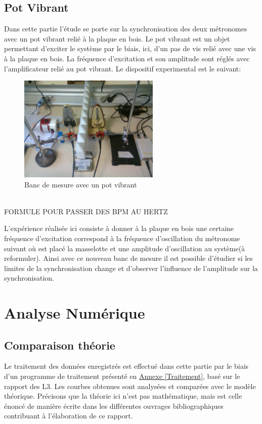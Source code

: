 \documentclass[a4paper,11pt]{report}
\begin{document}
\section{Pot Vibrant}
Dans cette partie l'étude se porte sur la synchronisation des deux métronomes avec un pot vibrant relié à la plaque en bois. Le pot vibrant est un objet permettant d'exciter le système par le biais, ici, d'un pas de vis relié avec une vis à la plaque en bois. La fréquence d'excitation et son amplitude sont réglés avec l'amplificateur relié au pot vibrant. Le dispositif experimental est le suivant:
\begin{figure}[h]
\centering
\includegraphics[width=0.6\textwidth]{Bancpotvibrant}
\caption{Banc de mesure avec un pot vibrant}\label{BancPot}
\end{figure}\\

FORMULE POUR PASSER DES BPM AU HERTZ

L'expérience réalisée ici consiste à donner à la plaque en bois une certaine fréquence d'excitation correspond à la fréquence d'oscillation du métronome suivant où est placé la masselotte et une amplitude d'oscillation au système(à reformuler).
Ainsi avec ce nouveau banc de mesure il est possible d'étudier si les limites de la synchronisation change et d'observer l'influence de l'amplitude sur la synchronisation.
 

\chapter{Analyse Numérique}
\section{Comparaison théorie}
Le traitement des données enregistrés est effectué dans cette partie par le biais d'un programme de traitement présenté en \underline{Annexe \ref{Traitement}}, basé sur le rapport des L3\cite{ram}. Les courbes obtenues sont analysées et comparées avec le modèle théorique. Précisons que la théorie ici n'est pas mathématique, mais est celle énoncé de manière écrite dans les différentes ouvrages bibliographiques contribuant à l'élaboration de ce rapport.
\end{document}
